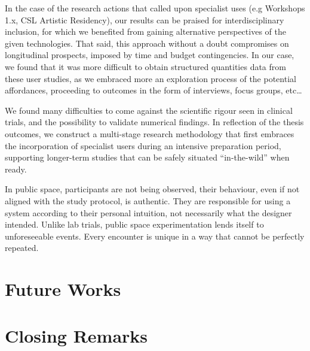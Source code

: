 In the case of the research actions that called upon specialist uses (e.g Workshops 1.x, CSL Artistic Residency), our results can be praised for interdisciplinary inclusion, for which we benefited from gaining alternative perspectives of the given technologies. That said, this approach without a doubt compromises on longitudinal prospects, imposed by time and budget contingencies. In our case, we found that it was more difficult to obtain structured quantities data from these user studies, as we embraced more an exploration process of the potential affordances, proceeding to outcomes in the form of interviews, focus groups, etc…

We found many difficulties to come against the scientific rigour seen in clinical trials, and the possibility to validate numerical findings. In reflection of the thesis outcomes, we construct a multi-stage research methodology that first embraces the incorporation of specialist users during an intensive preparation period, supporting longer-term studies that can be safely situated “in-the-wild” when ready.

In public space, participants are not being observed, their behaviour, even if not aligned with the study protocol, is authentic. They are responsible for using a system according to their personal intuition, not necessarily what the designer intended. Unlike lab trials, public space experimentation lends itself to unforeseeable events. Every encounter is unique in a way that cannot be perfectly repeated. 

\section{Future Works}

\section{Closing Remarks}

